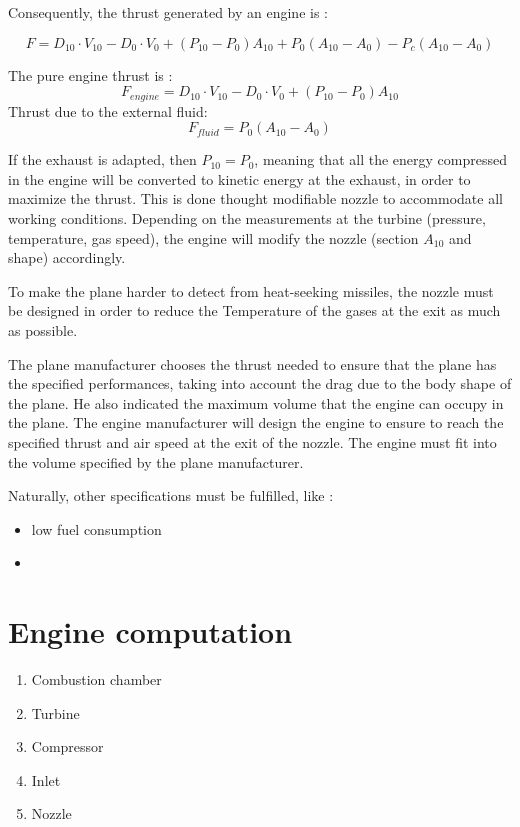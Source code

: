 \documentclass[12pt,a4paper]{article}
\begin{document}
Consequently, the thrust generated by an engine is :

\begin{dmath}
    F = D_{10} \cdot V_{10} - D_{0} \cdot V_{0} + (P_{10} - P_0) A_{10} + P_0 (A_{10} -A_0) -  P_c (A_{10} - A_0)
\end{dmath}

The pure engine thrust is :
\begin{dmath}
    F_{engine} = D_{10} \cdot V_{10} - D_{0} \cdot V_{0} + (P_{10} - P_0) A_{10}
\end{dmath}
Thrust due to the external fluid:
\begin{dmath}
    F_{fluid} = P_0 (A_{10} -A_0)
\end{dmath}

If the exhaust is adapted, then $P_{10} = P_0$, meaning that all the energy compressed in the engine will be converted to kinetic energy at the exhaust, in order to maximize the thrust. This is done thought modifiable nozzle to accommodate all working conditions. Depending on the measurements at the turbine (pressure, temperature, gas speed), the engine will modify the nozzle (section $A_{10}$ and shape) accordingly.

To make the plane harder to detect from heat-seeking missiles, the nozzle must be designed in order to reduce the Temperature of the gases at the exit as much as possible.

The plane manufacturer chooses the thrust needed to ensure that the plane has the specified performances, taking into account the drag due to the body shape of the plane. He also indicated the maximum volume that the engine can occupy in the plane.
The engine manufacturer will design the engine to ensure to reach the specified thrust and air speed at the exit of the nozzle. The engine must fit into the volume specified by the plane manufacturer.

Naturally, other specifications must be fulfilled, like :
\begin{itemize}
    \item low fuel consumption
    \item
\end{itemize}

\section{Engine computation}
\begin{enumerate}
    \item Combustion chamber
    \item Turbine
    \item Compressor
    \item Inlet
    \item Nozzle
\end{enumerate}
\end{document}
